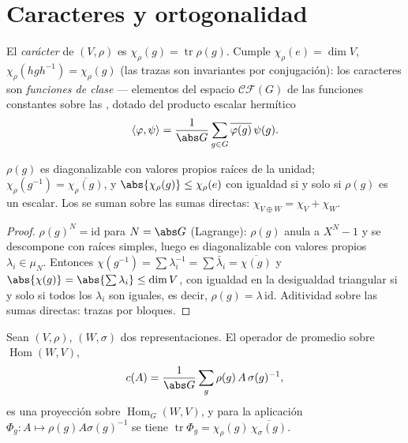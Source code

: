 \section{Caracteres y ortogonalidad}

\begin{definition}\label{def:b3:representations:character}
El \emph{carácter} de $(V, \rho)$ es
$\chi_\rho(g) = \operatorname{tr}\rho(g)$. Cumple
$\chi_\rho(e) = \dim V$, $\chi_\rho(hgh^{-1}) = \chi_\rho(g)$
(las trazas son invariantes por conjugación): los caracteres son
\emph{funciones de clase} --- elementos del
espacio $\mathcal{CF}(G)$ de las funciones constantes sobre las
, dotado del
producto escalar hermítico
\[
\langle \varphi, \psi\rangle = \frac1{\abs G}\sum_{g \in G}
\overline{\varphi(g)}\,\psi(g).
\]
\end{definition}

\begin{proposition}\label{prop:b3:representations:charbasics}
$\rho(g)$ es diagonalizable con valores propios raíces de la unidad;
$\chi_\rho(g^{-1}) = \overline{\chi_\rho(g)}$, y
$\abs{\chi_\rho(g)} \leq \chi_\rho(e)$ con igualdad si y solo si
$\rho(g)$ es un escalar. Los
 se suman sobre las
sumas directas: $\chi_{V
\oplus W} = \chi_V + \chi_W$.
\end{proposition}

\begin{proof}
$\rho(g)^N = \mathrm{id}$ para $N = \abs G$ (Lagrange): $\rho(g)$ anula
a $X^N - 1$ y se descompone con raíces simples, luego es diagonalizable
con valores propios $\lambda_i \in \mu_N$. Entonces
$\chi(g^{-1}) = \sum \lambda_i^{-1} = \sum\bar\lambda_i =
\overline{\chi(g)}$ y $\abs{\chi(g)} = \abs{\sum\lambda_i}
\leq \dim V$, con igualdad en la desigualdad triangular si y solo si
todos los $\lambda_i$ son iguales, es decir,
$\rho(g) = \lambda\,\mathrm{id}$. Aditividad sobre las sumas directas:
trazas por bloques.
\end{proof}

\begin{lemma}\label{lem:b3:representations:homtrace}
Sean $(V, \rho)$, $(W, \sigma)$ dos
representaciones. El operador de
promedio sobre $\operatorname{Hom}(W, V)$,
\[
c(A) = \frac1{\abs G}\sum_{g}\rho(g)\,A\,\sigma(g)^{-1},
\]
es una proyección sobre $\operatorname{Hom}_G(W, V)$, y para la
aplicación $\Phi_g \colon A \mapsto \rho(g)A\sigma(g)^{-1}$ se tiene
$\operatorname{tr}\Phi_g =
\chi_\rho(g)\,\overline{\chi_\sigma(g)}$.
\end{lemma}

